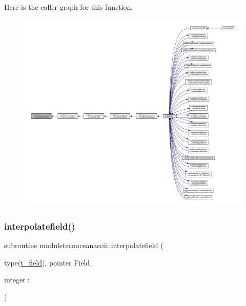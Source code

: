 Here is the caller graph for this function\+:\nopagebreak
\begin{figure}[H]
\begin{center}
\leavevmode
\includegraphics[width=350pt]{namespacemoduletecnoceanascii_acb08e8b922f987a8851cdd00f46ab1ac_icgraph}
\end{center}
\end{figure}
\mbox{\label{namespacemoduletecnoceanascii_a305beb20ba1bce59460e369c5385e130}} 
\subsubsection{\texorpdfstring{interpolatefield()}{interpolatefield()}}
{\footnotesize\ttfamily subroutine moduletecnoceanascii\+::interpolatefield (\begin{DoxyParamCaption}\item[{type(\mbox{\hyperlink{structmoduletecnoceanascii_1_1t__field}{t\+\_\+field}}), pointer}]{Field,  }\item[{integer}]{i }\end{DoxyParamCaption})\hspace{0.3cm}{\ttfamily [private]}}

